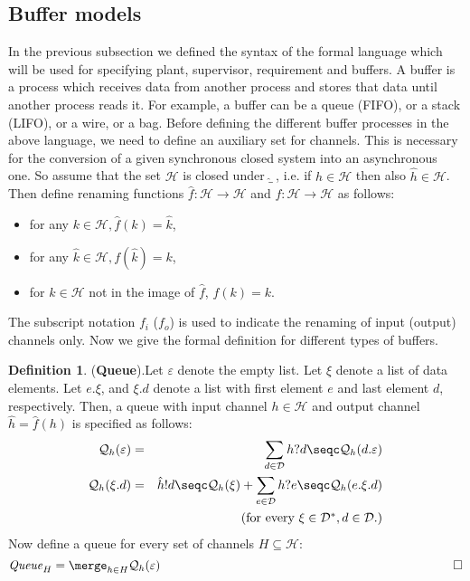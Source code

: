 \documentclass[a4paper,english,final]{article}
\theoremstyle{plain}
\theoremstyle{definition}
\newtheorem{definition}[theorem]{Definition}
\newcommand{\chan}{\ensuremath{\mathcal{H}}}
\newcommand{\data}{\ensuremath{\mathcal{D}}}
\begin{document}
\subsection{Buffer models}\label{buffermodels}
In the previous subsection we defined the syntax of the formal language which will be used for specifying plant, supervisor, requirement and buffers. A buffer is a process which receives data from another process and stores that data until another process reads it. For example, a buffer can be a queue (FIFO), or a stack (LIFO), or a wire, or a bag. Before defining the different buffer processes in the above language, we need to define an auxiliary set for channels. This is necessary for the conversion of a given synchronous closed system into an asynchronous one. So assume that the set $\chan$ is closed under $\hat{\_}\:$, i.e. if $h\in\chan$ then also $\hat{h}\in\chan$. Then define renaming functions $\hat{f}:\chan \rightarrow \chan$ and $f:\chan\rightarrow\chan$ as follows:
\begin{itemize}
\item for any $k\in\chan, \hat{f}(k)=\hat{k}$,
\item for any $\hat{k}\in\chan, f(\hat{k})=k$,
\item for $k\in\chan$ not in the image of $\hat{f}$, $f(k)=k$.
\end{itemize}
The subscript notation $f_i$ ($f_o$) is used to indicate the renaming of input (output) channels only. Now we give the formal definition for different types of buffers.
\begin{definition}{(\textbf{Queue}).}\label{queuedef}
Let $\varepsilon$ denote the empty list. Let $\xi$ denote a list of data elements. Let $e.\xi$, and $\xi.d$ denote a list with first element $e$ and last element $d$, respectively. Then, a queue with input channel $h\in \chan$ and output channel $\hat{h}=\hat{f}(h)$ is specified as follows:
\begin{eqnarray*}
\mathcal{Q}_{h}(\varepsilon)&=&\sum_{d\in \data}h?d\seqc \mathcal{Q}_{h}(d.\varepsilon)\\
\mathcal{Q}_{h}(\xi.d) &=& \hat{h}!d\seqc \mathcal{Q}_{h}(\xi)+\sum_{e\in \data}h?e\seqc \mathcal{Q}_{h}(e.\xi.d)\\
&&\mbox{ (for every $\xi\in\data^{*},d\in\data$.)}
\end{eqnarray*}
Now define a queue for every set of channels $H \subseteq \chan$:\newline
\[\mathit{Queue}_{H}= \merge_{h \in H}\mathcal{Q}_{h}(\varepsilon) \hspace{7.7cm}\qed \]
\end{definition}
\end{document}
